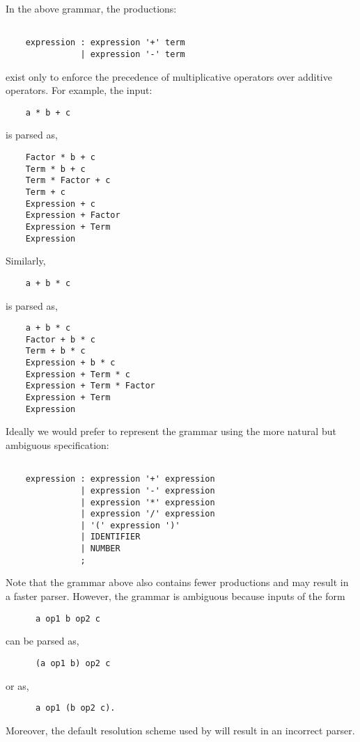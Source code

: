 In the above grammar, the productions:
\begin{verbatim}

    expression : expression '+' term
               | expression '-' term

\end{verbatim}
exist only to enforce the precedence of multiplicative
operators over additive operators.  For example, the input:
\newpage
\begin{verbatim}
    a * b + c
\end{verbatim}
is parsed as,
\begin{verbatim}
    Factor * b + c
    Term * b + c
    Term * Factor + c
    Term + c
    Expression + c
    Expression + Factor
    Expression + Term
    Expression
\end{verbatim}

Similarly,
\begin{verbatim}
    a + b * c
\end{verbatim}
is parsed as,
\begin{verbatim}
    a + b * c
    Factor + b * c
    Term + b * c
    Expression + b * c
    Expression + Term * c
    Expression + Term * Factor
    Expression + Term
    Expression
\end{verbatim}

Ideally we would prefer to represent the grammar using the more natural
but ambiguous specification:
\begin{verbatim}

    expression : expression '+' expression
               | expression '-' expression
               | expression '*' expression
               | expression '/' expression
               | '(' expression ')'
               | IDENTIFIER
               | NUMBER
               ;
\end{verbatim}

Note that the grammar above also contains fewer
productions and may result in a faster parser.  However, the grammar
is ambiguous because inputs of the form
\newpage
\begin{verbatim}
      a op1 b op2 c
\end{verbatim}
can be parsed as,
\begin{verbatim}
      (a op1 b) op2 c
\end{verbatim}
or as,
\begin{verbatim}
      a op1 (b op2 c).
\end{verbatim}

Moreover, the default resolution scheme used by \ayacc will result in an
incorrect parser.


